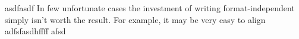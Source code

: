 asdfasdf
In few unfortunate cases the investment of writing format-independent \latex simply isn't worth the result. For example, it may be very easy to align adfsfasdhffff
afsd